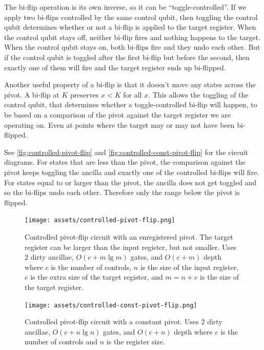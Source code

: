 \documentclass[twocolumn,longbibliography]{quantumarticle-customized}
\begin{document}
The bi-flip operation is its own inverse, so it can be ``toggle-controlled''.
If we apply two bi-flips controlled by the same control qubit, then toggling the control qubit determines whether or not a bi-flip is applied to the target register.
When the control qubit stays off, neither bi-flip fires and nothing happens to the target.
When the control qubit stays on, both bi-flips fire and they undo each other.
But if the control qubit is toggled after the first bi-flip but before the second, then exactly one of them will fire and the target register ends up bi-flipped.

Another useful property of a bi-flip is that it doesn't move any states across the pivot.
A bi-flip at $K$ preserves $x<K$ for all $x$.
This allows the toggling of the control qubit, that determines whether a toggle-controlled bi-flip will happen, to be based on a comparison of the pivot against the target register we are operating on.
Even at points where the target may or may not have been bi-flipped.

See \autoref{fig:controlled-pivot-flip} and \autoref{fig:controlled-const-pivot-flip} for the circuit diagrams.
For states that are less than the pivot, the comparison against the pivot keeps toggling the ancilla and exactly one of the controlled bi-flips will fire.
For states equal to or larger than the pivot, the ancilla does not get toggled and so the bi-flips undo each other.
Therefore only the range below the pivot is flipped.

\begin{figure}
  \centering
  \texttt{[image: assets/controlled-pivot-flip.png]}
  \caption{
    Controlled pivot-flip circuit with an enregistered pivot.
    The target register can be larger than the input register, but not smaller.
    Uses $2$ dirty ancillae, $O(c + m \lg m)$ gates, and $O(c + m)$ depth where $c$ is the number of controls, $n$ is the size of the input register, $e$ is the extra size of the target register, and $m=n+e$ is the size of the target register.
  }
  \label{fig:controlled-pivot-flip}
\end{figure}

\begin{figure}
  \centering
  \texttt{[image: assets/controlled-const-pivot-flip.png]}
  \caption{
    Controlled pivot-flip circuit with a constant pivot.
    Uses $2$ dirty ancillae, $O(c + n \lg n)$ gates, and $O(c + n)$ depth where $c$ is the number of controls and $n$ is the register size.
  }
  \label{fig:controlled-const-pivot-flip}
\end{figure}
\end{document}
